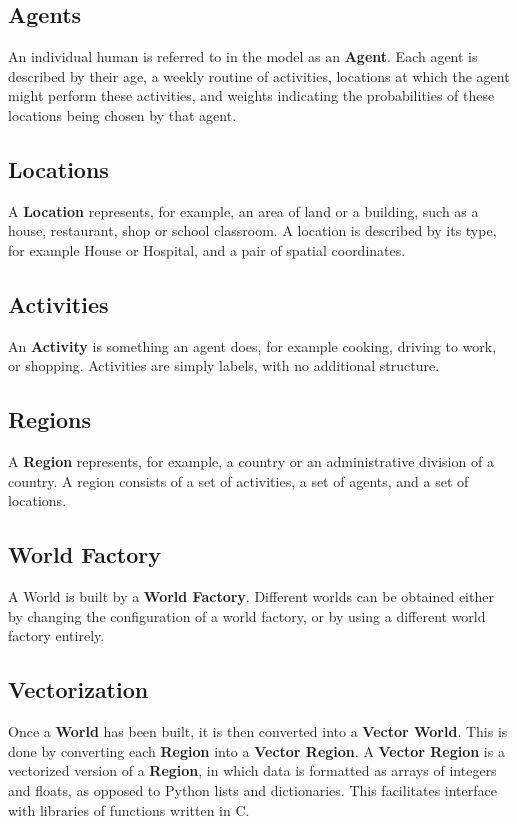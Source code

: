 \documentclass[10pt,letterpaper]{article}
\begin{document}
\subsection{Agents}
An individual human is referred to in the model as an \textbf{Agent}. Each agent is described by their age, a weekly routine of activities, locations at which the agent might perform these activities, and weights indicating the probabilities of these locations being chosen by that agent.

\subsection{Locations}
A \textbf{Location} represents, for example, an area of land or a building, such as a house, restaurant, shop or school classroom. A location is described by its type, for example House or Hospital, and a pair of spatial coordinates.

\subsection{Activities}
An \textbf{Activity} is something an agent does, for example cooking, driving to work, or shopping. Activities are simply labels, with no additional structure.

\subsection{Regions}
A \textbf{Region} represents, for example, a country or an administrative division of a country. A region consists of a set of activities, a set of agents, and a set of locations.

\subsection{World Factory}
A World is built by a \textbf{World Factory}. Different worlds can be obtained either by changing the configuration of a world factory, or by using a different world factory entirely.

\subsection{Vectorization}
Once a \textbf{World} has been built, it is then converted into a \textbf{Vector World}. This is done by converting each \textbf{Region} into a \textbf{Vector Region}. A \textbf{Vector Region} is a vectorized version of a \textbf{Region}, in which data is formatted as arrays of integers and floats, as opposed to Python lists and dictionaries. This facilitates interface with libraries of functions written in C.
\end{document}
